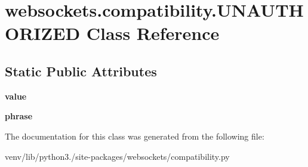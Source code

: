 \hypertarget{classwebsockets_1_1compatibility_1_1_u_n_a_u_t_h_o_r_i_z_e_d}{}\section{websockets.\+compatibility.\+U\+N\+A\+U\+T\+H\+O\+R\+I\+Z\+ED Class Reference}
\label{classwebsockets_1_1compatibility_1_1_u_n_a_u_t_h_o_r_i_z_e_d}
\subsection*{Static Public Attributes}
\begin{DoxyCompactItemize}
\item 
\mbox{\label{classwebsockets_1_1compatibility_1_1_u_n_a_u_t_h_o_r_i_z_e_d_ab43f2905fd8e25c3d964155441a5c8b2}} 
{\bfseries value}
\item 
\mbox{\label{classwebsockets_1_1compatibility_1_1_u_n_a_u_t_h_o_r_i_z_e_d_a5cd22352752815e03a24a46ee9e8a10c}} 
{\bfseries phrase}
\end{DoxyCompactItemize}


The documentation for this class was generated from the following file\+:\begin{DoxyCompactItemize}
\item 
venv/lib/python3./site-\/packages/websockets/compatibility.\+py\end{DoxyCompactItemize}

